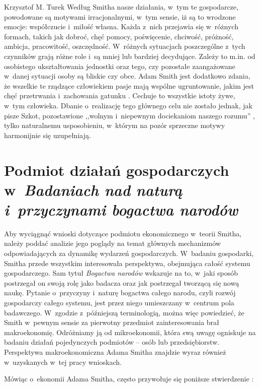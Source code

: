 \begin{artplenv}{Krzysztof M. Turek}
Według Smitha nasze działania, w~tym te gospodarcze, powodowane są motywami irracjonalnymi, w~tym sensie, iż są to
wrodzone emocje: współczucie i~miłość własna. Każda z~nich przejawia się w~różnych formach, takich jak dobroć, chęć
pomocy, poświęcenie, chciwość, próżność, ambicja, pracowitość, oszczędność. W~różnych sytuacjach poszczególne z~tych
czynników grają różne role i~są mniej lub bardziej decydujące. Zależy to m.in. od osobistego ukształtowania jednostki
oraz tego, czy pozostałe zaangażowane w~danej sytuacji osoby są bliskie czy obce. Adam Smith jest dodatkowo zdania, że
wszelkie te rządzące człowiekiem pasje mają wspólne ugruntowanie, jakim jest chęć przetrwania i~zachowania gatunku
\parencite[s.~69]{smith_theory_1969}.
Cechuje to wszystkie istoty żywe, w~tym człowieka. Dbanie o~realizację
tego głównego celu nie zostało jednak, jak pisze Szkot, pozostawione ,,wolnym i~niepewnym dociekaniom naszego rozumu''
\parencite[s.~69]{smith_theory_1969},
tylko naturalnemu usposobieniu, w~którym na pozór sprzeczne motywy
harmonijnie się uzupełniają. 

\section{Podmiot działań gospodarczych w~\textit{Badaniach nad naturą i~przyczynami bogactwa narodów}}

Aby wyciągnąć wnioski dotyczące podmiotu ekonomicznego w~teorii Smitha, należy poddać analizie jego poglądy na temat
głównych mechanizmów odpowiadających za dynamikę wydarzeń gospodarczych. W~badaniu gospodarki, Smitha przede wszystkim
interesowała perspektywa, obejmująca całość systemu gospodarczego. Sam tytuł \textit{Bogactwa narodów}
wskazuje na to, w~jaki sposób postrzegał on swoją rolę jako badacza oraz jak postrzegał tworzącą się
nową naukę. Pytanie o~przyczyny i~naturę bogactwa całego narodu, czyli rozwój gospodarczy całego systemu, jest przez
niego umieszczany w~centrum pola badawczego. W~zgodzie z~późniejszą terminologią, można więc powiedzieć, że Smith w~pewnym
sensie za pierwotny przedmiot zainteresowania brał makroekonomię. Odróżniamy ją od mikroekonomii, która swą uwagę
ogniskuje na badaniu działań pojedynczych podmiotów -- osób lub przedsiębiorstw. Perspektywa makroekonomiczna Adama
Smitha znajdzie wyraz również w~uzyskanych w~tej pracy wnioskach.

Mówiąc o~ekonomii Adama Smitha, często przywołuje się poniższe stwierdzenie
\parencite[s.~20]{smith_badania_2007}:


\end{artplenv}
